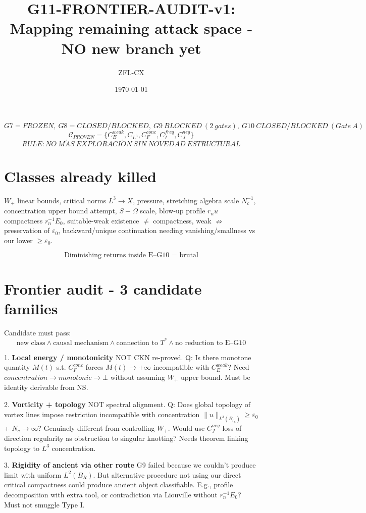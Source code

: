 \documentclass[11pt]{article}
\begin{document}
\title{G11-FRONTIER-AUDIT-v1: Mapping remaining attack space - NO new branch yet}
\author{ZFL-CX}\date{\today}\maketitle

\[
\boxed{G7=FROZEN,\ G8=CLOSED/BLOCKED,\ G9\ BLOCKED\ (2\ gates),\ G10\ CLOSED/BLOCKED\ (Gate\ A)}
\]
\[
\boxed{\mathcal C_{PROVEN}=\{C_E^{weak},C_{L^3},C_F^{conc},C_I^{freq},C_J^{neg}\}}
\]
\[
\boxed{RULE: NO\ M\acute AS\ EXPLORACI\acute ON\ SIN\ NOVEDAD\ ESTRUCTURAL}
\]

\section{Classes already killed}
$W_+$ linear bounds, critical norms $L^3\to X$, pressure, stretching algebra scale $N_c^{-1}$, concentration upper bound attempt, $S-\Omega$ scale, blow-up profile $r_nu$ compactness $r_n^{-1}E_0$, suitable-weak existence $\neq$ compactness, weak $\not\Rightarrow$ preservation of $\varepsilon_0$, backward/unique continuation needing vanishing/smallness vs our lower $\ge\varepsilon_0$.

\[
\boxed{\text{Diminishing returns inside E--G10 = brutal}}
\]

\section{Frontier audit - 3 candidate families}

Candidate must pass:
\[
\boxed{\text{new class}\land\text{causal mechanism}\land\text{connection to }T^*\land\text{no reduction to E--G10}}
\]

1. \textbf{Local energy / monotonicity} NOT CKN re-proved. Q: Is there monotone quantity $M(t)$ s.t. $C_F^{conc}$ forces $M(t)\to+\infty$ incompatible with $C_E^{weak}$? Need $concentration\to monotonic\to\bot$ without assuming $W_+$ upper bound. Must be identity derivable from NS.

2. \textbf{Vorticity + topology} NOT spectral alignment. Q: Does global topology of vortex lines impose restriction incompatible with concentration $ \|u\|_{L^3(B_{r_n})}\ge\varepsilon_0$ + $N_c\to\infty$? Genuinely different from controlling $W_+$. Would use $C_J^{neg}$ loss of direction regularity as obstruction to singular knotting? Needs theorem linking topology to $L^3$ concentration.

3. \textbf{Rigidity of ancient via other route} G9 failed because we couldn't produce limit with uniform $L^2(B_R)$. But alternative procedure not using our direct critical compactness could produce ancient object classifiable. E.g., profile decomposition with extra tool, or contradiction via Liouville without $r_n^{-1}E_0$? Must not smuggle Type I.
\end{document}
